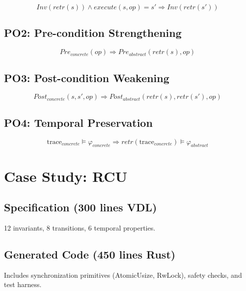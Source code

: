 \documentclass[conference]{IEEEtran}
\begin{document}
\begin{equation}
Inv(retr(s)) \wedge execute(s, op) = s' \Rightarrow Inv(retr(s'))
\end{equation}

\subsection{PO2: Pre-condition Strengthening}

\begin{equation}
Pre_{concrete}(op) \Rightarrow Pre_{abstract}(retr(s), op)
\end{equation}

\subsection{PO3: Post-condition Weakening}

\begin{equation}
Post_{concrete}(s, s', op) \Rightarrow Post_{abstract}(retr(s), retr(s'), op)
\end{equation}

\subsection{PO4: Temporal Preservation}

\begin{equation}
\text{trace}_{concrete} \models \varphi_{concrete} \Rightarrow retr(\text{trace}_{concrete}) \models \varphi_{abstract}
\end{equation}

\section{Case Study: RCU}

\subsection{Specification (300 lines VDL)}

12 invariants, 8 transitions, 6 temporal properties.

\subsection{Generated Code (450 lines Rust)}

Includes synchronization primitives (AtomicUsize, RwLock), safety checks, and test harness.
\end{document}
